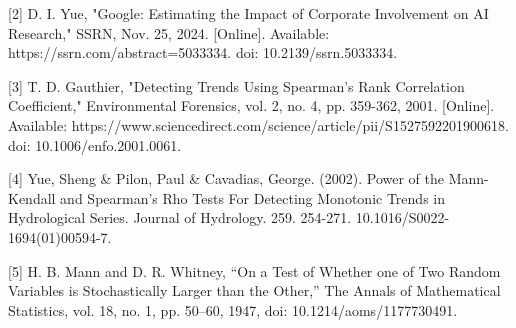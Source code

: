 \documentclass{article}
\begin{document}
[2] D. I. Yue, "Google: Estimating the Impact of Corporate Involvement on AI Research," SSRN, Nov. 25, 2024. [Online]. Available: https://ssrn.com/abstract=5033334. doi: 10.2139/ssrn.5033334.

[3] T. D. Gauthier, "Detecting Trends Using Spearman's Rank Correlation Coefficient," Environmental Forensics, vol. 2, no. 4, pp. 359-362, 2001. [Online]. Available: https://www.sciencedirect.com/science/article/pii/S1527592201900618. doi: 10.1006/enfo.2001.0061.

[4] Yue, Sheng \& Pilon, Paul \& Cavadias, George. (2002). Power of the Mann-Kendall and Spearman's Rho Tests For Detecting Monotonic Trends in Hydrological Series. Journal of Hydrology. 259. 254-271. 10.1016/S0022-1694(01)00594-7. 

[5] H. B. Mann and D. R. Whitney, “On a Test of Whether one of Two Random Variables is Stochastically Larger than the Other,” The Annals of Mathematical Statistics, vol. 18, no. 1, pp. 50–60, 1947, doi: 10.1214/aoms/1177730491.
\end{document}
